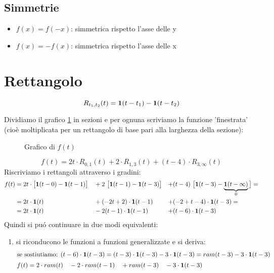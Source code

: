 \documentclass[../main.tex]{subfiles}
\begin{document}
	\subsection{Simmetrie}
		\begin{itemize}
			\item $ f(x) = f(-x) $: simmetrica rispetto l'asse delle y
			\item $ f(x) = -f(x) $: simmetrica rispetto l'asse delle x  	
		\end{itemize}
	\section{Rettangolo}
		$$ R_{t_{1},t_{2}}(t) = \gr[t - t_{1}] - \gr[t - t_{2}] $$
		
	\begin{Exercise}[title={Derivata di una funzione definita a tratti}, difficulty=3]
		Dividiamo il grafico \ref{fig:grafico_f} in sezioni e per ognuna scriviamo la funzione 'finestrata' (cioè moltiplicata per un rettangolo di base pari alla larghezza della sezione):
		\begin{figure}[h!]
			\centering
			\resizebox{.4\columnwidth}{!}{}
			\caption{Grafico di $ f(t) $}
			\label{fig:grafico_f}
		\end{figure}
		$$ f(t) = 2t \cdot R_{0,1}(t) + 2 \cdot R_{1,3}(t) + (t-4) \cdot R_{3,\infty}(t) $$
		Riscriviamo i rettangoli attraverso i gradini:
		\begin{align*}
			f(t) &= 2t \cdot \big[ \gr[t-0] - \gr[t-1] \big] &&+ 2\ \big[\gr[t-1] - \gr[t-3]\big] & +&(t-4)\ \big[\gr[t-3] - \underbrace{\gr[t - \infty]}_{0} \big] =\\
			&= 2t \cdot \gr[t] &&+ (-2t+2) \cdot \gr[t-1] & +&(-2+t-4) \cdot \gr[t-3] =\\
			&= 2t \cdot \gr[t] &&- 2(t-1) \cdot \gr[t-1] & +&(t-6) \cdot \gr[t-3]
		\end{align*}
		Quindi si pu\'o continuare in due modi equivalenti:
		\begin{enumerate}
			\item si riconducono le funzioni a funzioni generalizzate e si deriva:
				\begin{align}
					\intertext{se sostiutiamo: $ (t-6) \cdot \gr[t-3] = (t-3) \cdot \gr[t-3] - 3 \cdot \gr[t-3] = ram(t-3) - 3 \cdot \gr[t-3] $}
					f(t) &= 2 \cdot ram(t) &&- 2 \cdot ram(t-1) &&+ram(t-3) &&- 3 \cdot \gr[t-3] \nonumber\\

\end{align}
\end{enumerate}
\end{Exercise}
\end{document}
